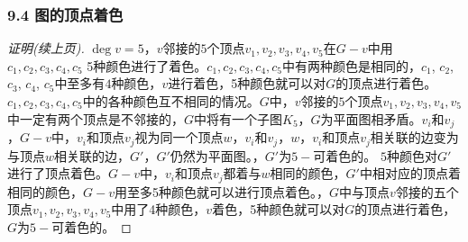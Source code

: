 \documentclass{beamer}
\begin{document}
\begin{CJK}{UTF8}{gbsn}
\begin{frame}
\end{frame}
\begin{frame}
  \frametitle{9.4 图的顶点着色}
{\small
  \begin{proof}[证明(续上页)]\justifying\let\raggedright\justifying
  $\deg v = 5$，$v$邻接的$5$个顶点$v_1,v_2,v_3,v_4,v_5$在$G-v$中用$c_1,c_2,c_3,c_4,c_5$ 5种颜色进行了着色。$c_1,c_2,c_3,c_4,c_5$中有两种颜色是相同的，$c_1$, $c_2$, $c_3$, $c_4$, $c_5$中至多有$4$种颜色，$v$进行着色，5种颜色就可以对$G$的顶点进行着色。$c_1,c_2,c_3,c_4,c_5$中的各种颜色互不相同的情况。$G$中，$v$邻接的$5$个顶点$v_1,v_2,v_3,v_4,v_5$中一定有两个顶点是不邻接的，$G$中将有一个子图$K_5$，$G$为平面图相矛盾。$v_i$和$v_j$，$G-v$中，$v_i$和顶点$v_j$视为同一个顶点$w$，$v_i$和$v_j$，$w$，$v_i$和顶点$v_j$相关联的边变为与顶点$w$相关联的边，$G'$，$G'$仍然为平面图。，\pause$G'$为$5-$可着色的。 $5$种颜色对$G'$进行了顶点着色。$G-v$中，$v_i$和顶点$v_j$都着与$w$相同的颜色，$G'$中相对应的顶点着相同的颜色，$G-v$用至多5种颜色就可以进行顶点着色。，\pause$G$中与顶点$v$邻接的五个顶点$v_1,v_2,v_3,v_4,v_5$中用了4种颜色，$v$着色，5种颜色就可以对$G$的顶点进行着色，$G$为$5-$可着色的。
\end{proof}}

\end{frame}





\end{CJK}
\end{document}
